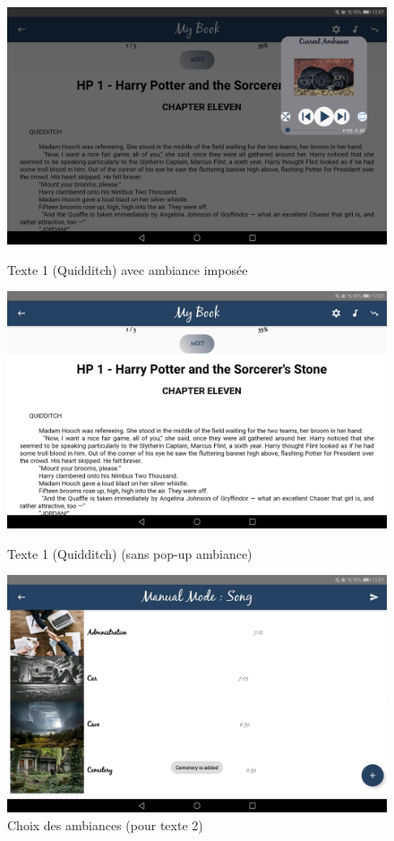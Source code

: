 \documentclass[a4paper,14pt]{report}
\begin{document}
\begin{figure}[!h]
\begin{center}
\includegraphics[scale=0.15]{../Images/texte1Ambiance.jpg}
\caption{Texte 1 (Quidditch) avec ambiance imposée}
\end{center}

\begin{center}

\includegraphics[scale=0.15]{../Images/texte1.jpg}
\caption{Texte 1 (Quidditch)  (sans pop-up ambiance) }

\end{center}

\begin{center}

\includegraphics[scale=0.15]{../Images/selectAtmosphere.jpg}
\caption{Choix des ambiances (pour texte 2) }


\end{center}
\end{figure}
\end{document}
